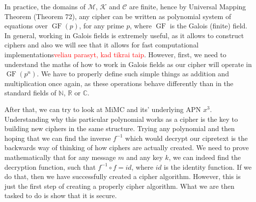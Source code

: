 \documentclass{Resources/UoBLab1}
\theoremstyle{definition}
\begin{document}
In practice, the domains of $\mathcal{M}$, $\mathcal{K}$ and $\mathcal{C}$ are finite, hence by Universal Mapping Theorem (Theorem 72\cite{CryptanalysisBook}), any cipher can be written as polynomial system of equations over $\operatorname{GF}(p)$, for any prime $p$, where $\operatorname{GF}$ is the Galois (finite) field. In general, working in Galois fields is extremely useful, as it allows to construct ciphers and also we will see that it allows for fast computational implementations\textcolor{red}{veliau parasyt, kad tikrai taip}. However, first, we need to understand the maths of how to work in Galois fields as our cipher will operate in $\operatorname{GF}(p^n)$. We have to properly define such simple things as addition and multiplication once again, as these operations behave differently than in the standard fields of $\mathbb{N}$, $\mathbb{R}$ or $\mathbb{C}$.

After that, we can try to look at MiMC and its' underlying APN $x^3$. Understanding why this particular polynomial works as a cipher is the key to building new ciphers in the same structure. Trying any polynomial and then hoping that we can find the inverse $f^{-1}$ which would decrypt our cipretext is the backwards way of thinking of how ciphers are actually created. We need to prove mathematically that for any message $m$ and any key $k$, we can indeed find the decryption function, such that \(f^{-1} \circ f = id\), where $id$ is the identity function. If we do that, then we have successfully created a cipher algorithm. However, this is just the first step of creating a properly cipher algorithm. What we are then tasked to do is show that it is secure.
\end{document}
